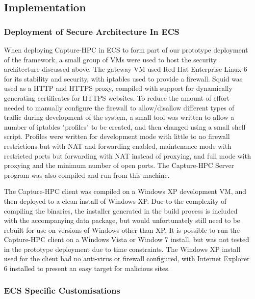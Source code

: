 \subsection{Implementation}

\subsubsection{Deployment of Secure Architecture In ECS}


When deploying Capture-HPC in ECS to form part of our prototype deployment of
the framework, a small group of VMs were used to host the security architecture
discussed above. The gateway VM used Red Hat Enterprise Linux 6 for its
stability and security,
with iptables used to provide a firewall. Squid was used as a HTTP and HTTPS proxy, compiled with
support for dynamically generating certificates for HTTPS websites. To reduce
the amount of effort needed to manually configure the firewall to allow/disallow
different types of traffic during
development of the system, a small tool was written to allow a number of
iptables "profiles" to be created, and then changed using a small shell script. Profiles were written for
development mode with little to no firewall restrictions but with NAT and
forwarding enabled, maintenance mode with restricted ports but forwarding with
NAT instead of proxying, and full mode with proxying and the minimum number of
open ports. The Capture-HPC Server program was also compiled and run from this machine.

The Capture-HPC client was compiled on a Windows XP development VM, and then
deployed to a clean install of Windows XP. Due to the complexity of compiling
the binaries, the installer generated in the build process is included with the
accompanying data package, but would unfortunately still need to be rebuilt for
use on versions of Windows other than XP. It is possible to run the
Capture-HPC client on a Windows Vista or Window 7 install, but was not tested in
the prototype deployment due to time constraints. The Windows XP install used
for the client had no anti-virus or firewall configured, with Internet Explorer
6 installed to present an easy target for malicious sites.

\subsubsection{ECS Specific Customisations}

